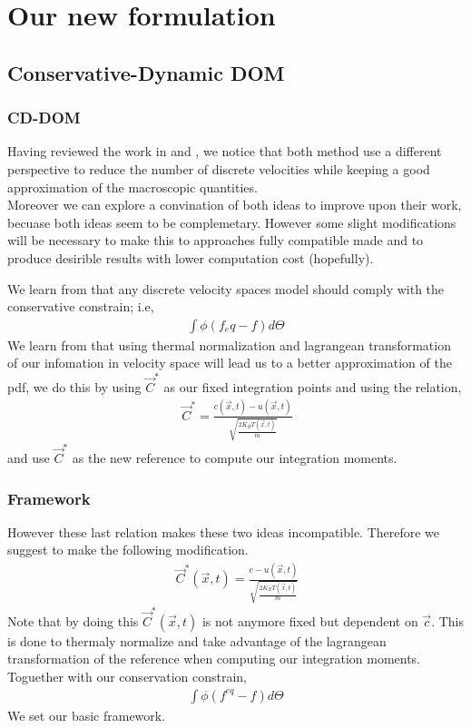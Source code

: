 \section{Our new formulation}
\subsection{Conservative-Dynamic DOM}

\begin{frame}
	\frametitle{CD-DOM}
	Having reviewed the work in \cite{Huang2011261} and \cite{Hsu201239}, we notice that both method use a different perspective to reduce the number of discrete velocities while keeping a good approximation of the macroscopic quantities. \\
	
	Moreover we can explore a convination of both ideas to improve upon their work, becuase both ideas seem to be complemetary. However some slight modifications will be necessary to make this to approaches fully compatible made and to produce desirible results with lower computation cost (hopefully).
\end{frame}

\begin{frame}
	We learn from \cite{Huang2011261} that any discrete velocity spaces model should comply with the conservative constrain; i.e,
	\begin{align*}
		\int \phi \left( f_eq - f \right) d\Theta
	\end{align*}
	We learn from \cite{Hsu201239} that using thermal normalization and lagrangean transformation of our infomation in velocity space will lead us to a better approximation of the pdf, we do this by using $\vec{C}^*$ as our fixed integration points and using the relation,
	\begin{align*}
		\ \vec{C}^{*} = \frac{c(\vec{x},t)-u(\vec{x},t)}{\sqrt{\frac{2 K_B T(\vec{x},t)}{m}}}
	\end{align*}
	and use $\vec{C}^{*}$ as the new reference to compute our integration moments.
\end{frame}

\begin{frame}
\frametitle{Framework}
	However these last relation makes these two ideas incompatible. Therefore we suggest to make the following modification.
	\begin{align*}
		\ \vec{C}^{*}(\vec{x},t) = \frac{c-u(\vec{x},t)}{\sqrt{\frac{2 K_B T(\vec{x},t)}{m}}}
	\end{align*}
	Note that by doing this $\vec{C}^*(\vec{x},t)$ is not anymore fixed but dependent on $\vec{c}$. This is done to thermaly normalize and take advantage of the lagrangean transformation of the reference when computing our integration moments. \\
	 Toguether with our conservation constrain,
	\begin{align*}
		\int \phi \left( f^{eq} - f \right) d\Theta
	\end{align*}
	We set our basic framework.
\end{frame}

